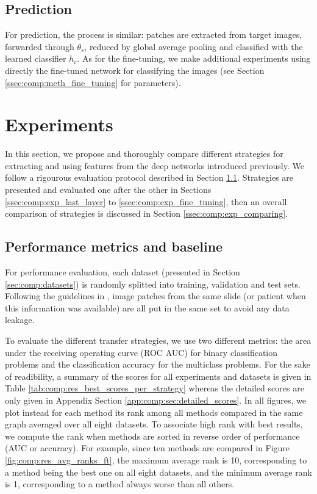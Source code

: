 \subsection{Prediction}
For prediction, the process is similar: patches are extracted from target images, forwarded through $\theta_s$, reduced by global average pooling and classified with the learned classifier $h_c$. As for the fine-tuning, we make additional experiments using directly the fine-tuned network for classifying the images (see Section \ref{ssec:comp:meth_fine_tuning} for parameters).


\section{Experiments}
\label{sec:comp:experiments}

In this section, we propose and thoroughly compare different strategies for extracting and using features from the deep networks introduced previously. We follow a rigourous evaluation protocol described in Section \ref{ssec:comp:protocol}. Strategies are presented and evaluated one after the other in Sections \ref{ssec:comp:exp_last_layer} to \ref{ssec:comp:exp_fine_tuning}, then an overall comparison of strategies is discussed in Section \ref{ssec:comp:exp_comparing}.


\subsection{Performance metrics and baseline}
\label{ssec:comp:protocol}
For performance evaluation, each dataset (presented in Section \ref{sec:comp:datasets}) is randomly splitted into training, validation and test sets. Following the guidelines in \parencite{maree2017need}, image patches from the same slide (or patient when this information was available) are all put in the same set to avoid any data leakage. %

To evaluate the different transfer strategies, we use two different metrics: the area under the receiving operating curve (ROC AUC) for binary classification problems and the classification accuracy for the multiclass problems. For the sake of readibility, a summary of the scores for all experiments and datasets is given in Table \ref{tab:comp:res_best_scores_per_strategy} whereas the detailed scores are only given in Appendix Section \ref{app:comp:sec:detailed_scores}. In all figures, we plot instead for each method its rank among all methods compared in the same graph averaged over all eight datasets. To associate high rank with best results, we compute the rank when methods are sorted in reverse order of performance (AUC or accuracy). For example, since ten methods are compared in Figure \ref{fig:comp:res_avg_ranks_ft}, the maximum average rank is 10, corresponding to a method being the best one on all eight datasets, and the minimum average rank is 1, corresponding to a method always worse than all others.

